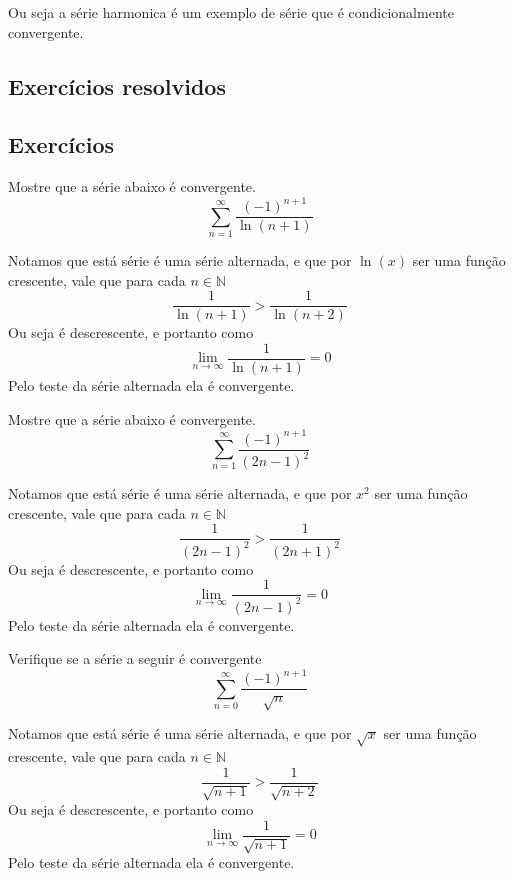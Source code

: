Ou seja a série harmonica é um exemplo de série que é condicionalmente convergente.

\subsection*{Exercícios resolvidos}

\construirExeresol


\subsection*{Exercícios}

\construirExer

\begin{exer}
    Mostre que a série abaixo é convergente.
    $$\sum_{n = 1}^{\infty} \frac{(-1)^{n+1}}{\ln(n+1)} $$
\end{exer}

\begin{resp}
    Notamos que está série é uma série alternada, e que por $\ln(x)$ ser uma
    função crescente, vale que para cada $n \in \mathbb{N}$
    $$\frac{1}{\ln(n+1)} > \frac{1}{\ln (n+2)}$$
    Ou seja é descrescente, e portanto como
    $$\lim_{n \to \infty} \frac{1}{\ln(n+1)} = 0 $$
    Pelo teste da série alternada ela é convergente.
\end{resp}

\begin{exer}
    Mostre que a série abaixo é convergente.
    $$\sum_{n = 1}^{\infty} \frac{(-1)^{n+1}}{(2n-1)^2} $$
\end{exer}

\begin{resp}
    Notamos que está série é uma série alternada, e que por $x^2$ ser uma
    função crescente, vale que para cada $n \in \mathbb{N}$
    $$\frac{1}{(2n-1)^2} > \frac{1}{(2n+1)^2}$$
    Ou seja é descrescente, e portanto como
    $$\lim_{n \to \infty}\frac{1}{(2n-1)^2} = 0 $$
    Pelo teste da série alternada ela é convergente.
\end{resp}

\begin{exer}
    Verifique se a série a seguir é convergente
    $$\sum_{n = 0}^{\infty} \frac{(-1)^{n+1}}{\sqrt n} $$
\end{exer}

\begin{resp}
    Notamos que está série é uma série alternada, e que por $\sqrt x$ ser uma
    função crescente, vale que para cada $n \in \mathbb{N}$
    $$\frac{1}{\sqrt{n+1}} > \frac{1}{\sqrt{n+2}}$$
    Ou seja é descrescente, e portanto como
    $$\lim_{n \to \infty} \frac{1}{\sqrt{n+1}} = 0 $$
    Pelo teste da série alternada ela é convergente.
\end{resp}


